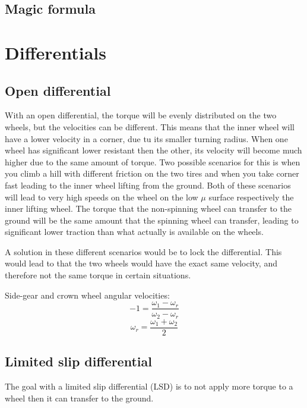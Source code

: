 \subsection{Magic formula}

\section{Differentials}

\subsection{Open differential}

With an open differential, the torque will be evenly distributed on the two wheels, but the velocities can be different. This means that the inner wheel will have a lower velocity in a corner, due tu its smaller turning radius. When one wheel has significant lower resistant then the other, its velocity will become much higher due to the same amount of torque. Two possible scenarios for this is when you climb a hill with different friction on the two tires and when you take corner fast leading to the inner wheel lifting from the ground. Both of these scenarios will lead to very high speeds on the wheel on the low $ \mu $ surface respectively the inner lifting wheel. The torque that the non-spinning wheel can transfer to the ground will be the same amount that the spinning wheel can transfer, leading to significant lower traction than what actually is available on the wheels.

A solution in these different scenarios would be to lock the differential. This would lead to that the two wheels would have the exact same velocity, and therefore not the same torque in certain situations. 

Side-gear and crown wheel angular velocities:
\begin{equation}
	-1 = \frac{\omega_{1} - \omega_{r}}{\omega_{2} - \omega_{r}}
\end{equation}
\begin{equation}
	\omega_{r} = \frac{\omega_{1} + \omega_{2}}{2}
\end{equation}

\subsection{Limited slip differential}

The goal with a limited slip differential (LSD) is to not apply more torque to a wheel then it can transfer to the ground.


